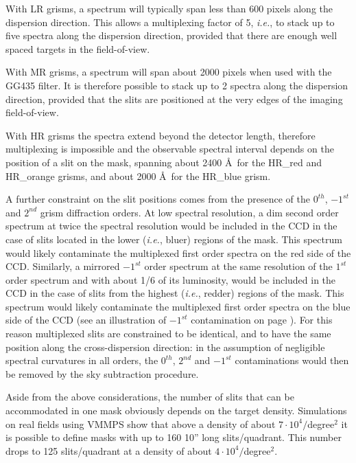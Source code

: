With LR grisms, a spectrum will typically span less than 600 pixels 
along the dispersion direction. This allows a multiplexing factor 
of 5, {\it i.e.}, to stack up to five spectra along the dispersion 
direction, provided that there are enough well spaced targets in 
the field-of-view. 

With MR grisms, a spectrum will span about 2000 pixels when used 
with the GG435 filter. It is therefore possible to stack
up to 2 spectra along the dispersion direction, provided that the slits 
are positioned at the very edges of the imaging field-of-view. 

With HR grisms the spectra extend beyond the detector length,
therefore multiplexing is impossible and
the observable spectral interval depends on the position 
of a slit on the mask, spanning about
2400 \AA\ for the HR\_red and HR\_orange grisms, and
about 2000 \AA\ for the HR\_blue grism.

A further constraint on the slit positions comes from the presence of 
the $0^{th}$, $-1^{st}$ and $2^{nd}$ grism diffraction orders.
At low spectral resolution, a dim second order spectrum at twice
the spectral resolution would be included in the CCD in the case of slits
located in the lower ({\it i.e.}, bluer) regions of the mask. This spectrum
would likely contaminate the multiplexed first order spectra on the
red side of the CCD. Similarly, a mirrored $-1^{st}$ order spectrum at the same
resolution of the $1^{st}$ order spectrum and with about 1/6
of its luminosity, would be included
in the CCD in the case of slits from the highest ({\it i.e.}, redder)
regions of the mask. This spectrum
would likely contaminate the multiplexed first order spectra on the
blue side of the CCD (see an illustration of $-1^{st}$ contamination on 
page \pageref{CONTAM}).
For this reason multiplexed slits are constrained to be identical,
and to have the same position along the cross-dispersion direction:
in the assumption of negligible spectral curvatures in all orders, 
the $0^{th}$, $2^{nd}$ and $-1^{st}$ contaminations would then be 
removed by the sky subtraction procedure.

Aside from the above considerations, the number of slits that can be 
accommodated in one mask obviously depends on the target density. 
Simulations on real fields using VMMPS show that above a density 
of about $7\cdot10^4/$degree$^2$ it is possible to define 
masks with up to 160 10'' long slits/quadrant. 
This number drops to 125 slits/quadrant at a density of about 
$4\cdot10^4/$degree$^2$.

